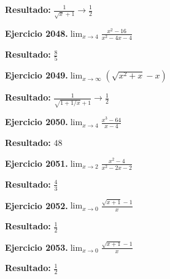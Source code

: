 \documentclass[10pt,a4paper]{article}
\begin{document}
\begin{solbox}
\textbf{Resultado:} \(\displaystyle \frac{1}{\sqrt{x}+1} \to \frac{1}{2}\)
\end{solbox}

\newpage
\begin{ejbox}
\textbf{Ejercicio 2048.}\quad $\lim_{x\to 4} \frac{x^2-16}{x^2-4x-4}$
\end{ejbox}

\begin{solbox}
\textbf{Resultado:} \(\displaystyle \frac{8}{5}\)
\end{solbox}

\begin{ejbox}
\textbf{Ejercicio 2049.}\quad $\lim_{x\to \infty} (\sqrt{x^2+x} - x)$
\end{ejbox}

\begin{solbox}
\textbf{Resultado:} \(\displaystyle \frac{1}{\sqrt{1+1/x}+1} \to \frac{1}{2}\)
\end{solbox}

\begin{ejbox}
\textbf{Ejercicio 2050.}\quad $\lim_{x\to 4} \frac{x^3-64}{x-4}$
\end{ejbox}

\begin{solbox}
\textbf{Resultado:} \(\displaystyle 48\)
\end{solbox}

\newpage
\begin{ejbox}
\textbf{Ejercicio 2051.}\quad $\lim_{x\to 2} \frac{x^2-4}{x^2-2x-2}$
\end{ejbox}

\begin{solbox}
\textbf{Resultado:} \(\displaystyle \frac{4}{3}\)
\end{solbox}

\begin{ejbox}
\textbf{Ejercicio 2052.}\quad $\lim_{x\to 0} \frac{\sqrt{x+1}-1}{x}$
\end{ejbox}

\begin{solbox}
\textbf{Resultado:} \(\displaystyle \frac{1}{2}\)
\end{solbox}

\begin{ejbox}
\textbf{Ejercicio 2053.}\quad $\lim_{x\to 0} \frac{\sqrt{x+1}-1}{x}$
\end{ejbox}

\begin{solbox}
\textbf{Resultado:} \(\displaystyle \frac{1}{2}\)
\end{solbox}
\end{document}
